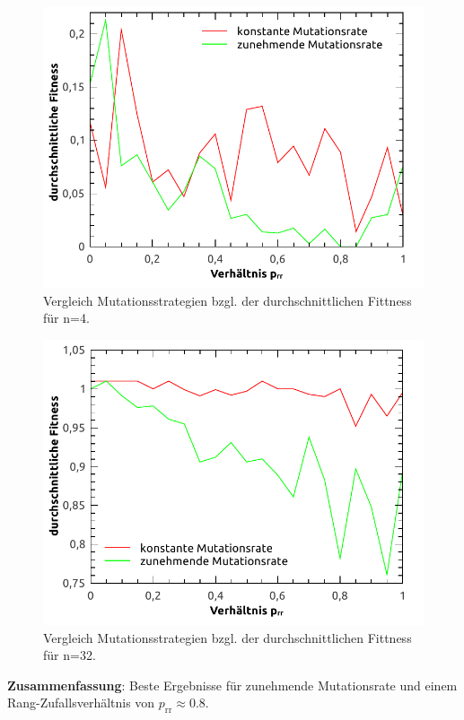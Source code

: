 \documentclass[12pt,
    a4paper,
    headinclude,
    footinclude]{scrartcl}
\begin{document}
	\begin{figure}[!h]
		\begin{center}
			\includegraphics[width=\size\textwidth]{../vortrag/abbildungen/vergleich_mutationsraten_n4.pdf}
			\caption{Vergleich Mutationsstrategien bzgl. der durchschnittlichen Fittness für n=4. }
		\end{center}
	\end{figure}
	\newpage
	\begin{figure}[!h]
		\begin{center}
			\includegraphics[width=\size\textwidth]{../vortrag/abbildungen/vergleich_mutationsraten_n32.pdf}
			\caption{Vergleich Mutationsstrategien bzgl. der durchschnittlichen Fittness für n=32.}
		\end{center}
	\end{figure}

	\textbf{Zusammenfassung}: Beste Ergebnisse für zunehmende Mutationsrate und einem Rang-Zufallsverhältnis von $p_\text{rr} \approx 0.8$.
	
\end{document}
